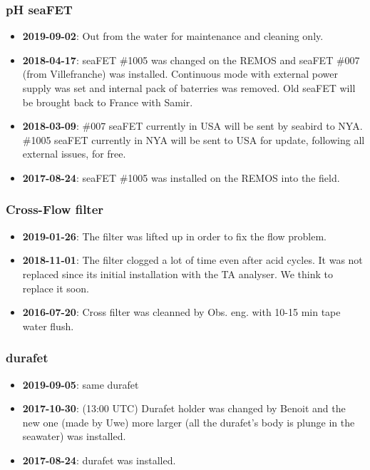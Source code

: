 \documentclass[
]{article}
\providecommand{\tightlist}{%
  \setlength{\itemsep}{0pt}\setlength{\parskip}{0pt}}
\begin{document}
\hypertarget{ph-seafet-1}{%
\subsubsection{\texorpdfstring{\textbf{pH
seaFET}}{pH seaFET}}\label{ph-seafet-1}}

\begin{itemize}
\tightlist
\item
  \textbf{2019-09-02}: Out from the water for maintenance and cleaning
  only.
\item
  \textbf{2018-04-17}: seaFET \#1005 was changed on the REMOS and seaFET
  \#007 (from Villefranche) was installed. Continuous mode with external
  power supply was set and internal pack of baterries was removed. Old
  seaFET will be brought back to France with Samir.
\item
  \textbf{2018-03-09}: \#007 seaFET currently in USA will be sent by
  seabird to NYA. \#1005 seaFET currently in NYA will be sent to USA for
  update, following all external issues, for free.
\item
  \textbf{2017-08-24}: seaFET \#1005 was installed on the REMOS into the
  field.
\end{itemize}

\hypertarget{cross-flow-filter}{%
\subsubsection{\texorpdfstring{\textbf{Cross-Flow
filter}}{Cross-Flow filter}}\label{cross-flow-filter}}

\begin{itemize}
\tightlist
\item
  \textbf{2019-01-26}: The filter was lifted up in order to fix the flow
  problem.
\item
  \textbf{2018-11-01}: The filter clogged a lot of time even after acid
  cycles. It was not replaced since its initial installation with the TA
  analyser. We think to replace it soon.
\item
  \textbf{2016-07-20}: Cross filter was cleanned by Obs. eng. with 10-15
  min tape water flush.
\end{itemize}

\hypertarget{durafet}{%
\subsubsection{\texorpdfstring{\textbf{durafet}}{durafet}}\label{durafet}}

\begin{itemize}
\tightlist
\item
  \textbf{2019-09-05}: same durafet
\item
  \textbf{2017-10-30}: (13:00 UTC) Durafet holder was changed by Benoit
  and the new one (made by Uwe) more larger (all the durafet's body is
  plunge in the seawater) was installed.
\item
  \textbf{2017-08-24}: durafet was installed.
\end{itemize}
\end{document}
